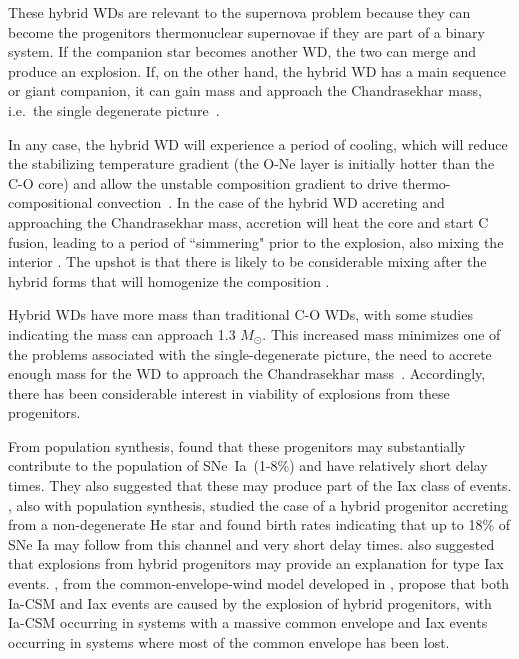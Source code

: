 \documentclass[preprint2]{aastex63}
\newcommand{\SNeIa}{SNe~Ia}
\newcommand{\Msun}{\ensuremath{M_\odot}}
\begin{document}
These hybrid WDs are relevant to the supernova problem because 
they can become the progenitors thermonuclear supernovae
if they are part of a binary system. If the companion star becomes
another WD, the two can merge and produce an explosion.
If, on the other hand, the hybrid WD has a main sequence 
or giant companion, it can gain mass and approach the Chandrasekhar mass, i.e.\  
the single degenerate picture~\citep{willcoxetal2016}.

In any case, the hybrid WD will experience a period of cooling,
which will reduce the stabilizing temperature gradient (the O-Ne layer is initially hotter 
than the C-O core) and allow the unstable composition gradient to drive 
thermo-compositional convection~\citep{brooksetal2017,schwabgaraud2019}.
In the case of the
hybrid WD accreting and approaching the Chandrasekhar mass, accretion will
heat the core and start C fusion, leading to a period of ``simmering" prior
to the explosion, also mixing the interior \citep{PiroBild08}. The upshot is 
that there is likely to be considerable mixing after the hybrid forms that will 
homogenize the composition \citep{denissenkovetal2015,brooksetal2017,schwabgaraud2019}.

Hybrid WDs have more mass than traditional C-O WDs, with some studies indicating the
mass can approach 1.3 \Msun \citep{chenetal2014}. This increased mass
minimizes one of the problems associated with the single-degenerate picture,
the need to accrete enough mass for the WD to approach the Chandrasekhar
mass~\citep{chenetal2014,denissenkovetal2015,kromeretal2015}.
Accordingly, there has been considerable interest in viability of explosions from
these progenitors.

From population synthesis, \citet{mengpods2014} found that these
progenitors may substantially contribute to the population of \SNeIa\ (1-8\%) and have
relatively short delay times. They also suggested that these
may produce part of the Iax class of events. \citet{Wangetal2014}, also with population
synthesis, studied the case
of a hybrid progenitor accreting from a non-degenerate He star and found
birth rates indicating that up to 18\% of SNe Ia may follow from this channel
and very short delay times. \citet{Wangetal2014} also suggested that explosions
from hybrid progenitors may provide an explanation for type Iax events.
\citet{mengpods2018}, from the common-envelope-wind model developed in
\citet{mengpods2014}, propose that both Ia-CSM and Iax events
are caused by the explosion of hybrid progenitors, with Ia-CSM occurring in systems with
a massive common envelope and Iax events occurring in systems where most of the common envelope
has been lost.
\end{document}
